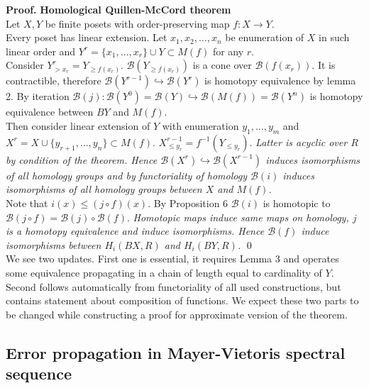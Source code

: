 \documentclass[a4paper, 12pt]{article}
\theoremstyle{definition}
\theoremstyle{remark}
\newenvironment{pf}{\noindent\textbf{Proof.}}{\qed}
\renewcommand{\leq}{\leqslant}
\renewcommand{\geq}{\geqslant}
\begin{document}
\begin{pf} \textbf{Homological Quillen-McCord theorem}\\
Let $X, Y$ be finite posets with order-preserving map $f : X \to Y$.\\

Every poset has linear extension. Let $x_1, x_2, \ldots, x_n$ be enumeration of $X$ in such linear order and $Y^r = \{x_1,\ldots,x_r\} \cup Y \subset M(f)$ for any $r$.\\

Consider $Y^r_{>x_r} = Y_{\geq f(x_r)}$. $\mathcal{B}(Y_{\geq f(x_r)})$ is a cone over $\mathcal{B}(f(x_r))$. It is contractible, therefore $\mathcal{B}(Y^{r-1}) \hookrightarrow \mathcal{B}(Y^{r})$ is homotopy equivalence by lemma 2. By iteration $\mathcal{B}(j) : \mathcal{B}(Y^{0}) = \mathcal{B}(Y) \hookrightarrow \mathcal{B}(M(f)) = \mathcal{B}(Y^n)$ is homotopy equivalence between $BY$ and $M(f)$.\\

Then consider linear extension of $Y$ with enumeration $y_1,\ldots,y_m$ and $X^r = X \cup \{y_{r+1},\ldots,y_n\} \subset M(f)$. $X^{r-1}_{\leq y_r} = f^{-1}(Y_{\leqslant y_r})$. \textit{Latter is acyclic over $R$ by condition of the theorem. Hence $\mathcal{B}(X^{r}) \hookrightarrow \mathcal{B}(X^{r-1})$ induces isomorphisms of all homology groups and by functoriality of homology $\mathcal{B}(i)$ induces isomorphisms of all homology groups between $X$ and $M(f)$.}\\

Note that $i(x) \leqslant (j \circ f)(x)$. By Proposition 6 $\mathcal{B}(i)$ is homotopic to $\mathcal{B}(j \circ f) = \mathcal{B}(j) \circ \mathcal{B}(f)$. \textit{Homotopic maps induce same maps on homology, $j$ is a homotopy equivalence and induce isomorphisms. Hence $\mathcal{B}(f)$ induce isomorphisms between $H_i(BX,R)$ and $H_i(BY,R)$.}
\end{pf}\\

We see two updates. First one is essential, it requires Lemma 3 and operates some equivalence propagating in a chain of length equal to cardinality of $Y$. Second follows automatically from functoriality of all used constructions, but contains statement about composition of functions. We expect these two parts to be changed while constructing a proof for approximate version of the theorem.

\subsection{Error propagation in Mayer-Vietoris spectral sequence}
\end{document}
